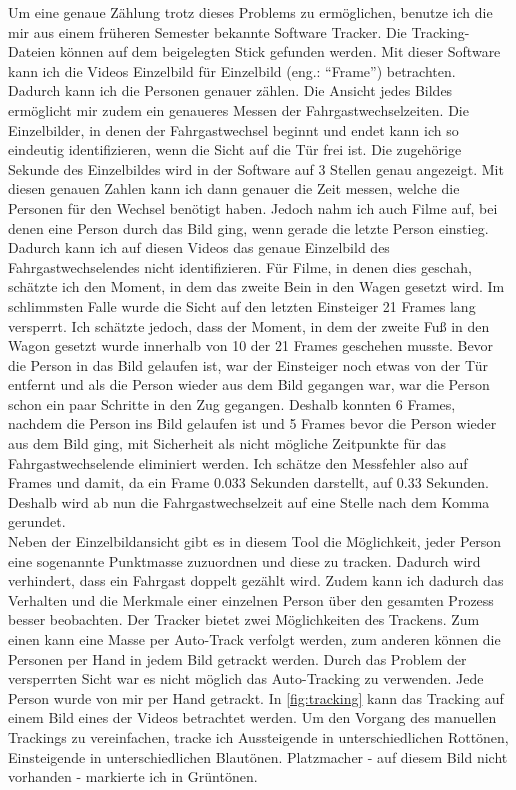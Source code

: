 Um eine genaue Zählung trotz dieses Problems zu ermöglichen, benutze ich die mir aus einem früheren Semester bekannte Software \textsf{Tracker}. Die Tracking-Dateien können auf dem beigelegten Stick gefunden werden. Mit dieser Software kann ich die Videos Einzelbild für Einzelbild (eng.: "`Frame"') betrachten. Dadurch kann ich die Personen genauer zählen. Die Ansicht jedes Bildes ermöglicht mir zudem ein genaueres Messen der Fahrgastwechselzeiten. Die Einzelbilder, in denen der Fahrgastwechsel beginnt und endet kann ich so eindeutig identifizieren, wenn die Sicht auf die Tür frei ist. Die zugehörige Sekunde des Einzelbildes wird in der Software auf 3 Stellen genau angezeigt. Mit diesen genauen Zahlen kann ich dann genauer die Zeit messen, welche die Personen für den Wechsel benötigt haben. Jedoch nahm ich auch Filme auf, bei denen eine Person durch das Bild ging, wenn gerade die letzte Person einstieg. Dadurch kann ich auf diesen Videos das genaue Einzelbild des Fahrgastwechselendes nicht identifizieren. Für Filme, in denen dies geschah, schätzte ich den Moment, in dem das zweite Bein in den Wagen gesetzt wird. Im schlimmsten Falle wurde die Sicht auf den letzten Einsteiger 21 Frames lang versperrt. Ich schätzte jedoch, dass der Moment, in dem der zweite Fuß in den Wagon gesetzt wurde innerhalb von 10 der 21 Frames geschehen musste. Bevor die Person in das Bild gelaufen ist, war der Einsteiger noch etwas von der Tür entfernt und als die Person wieder aus dem Bild gegangen war, war die Person schon ein paar Schritte in den Zug gegangen. Deshalb konnten 6 Frames, nachdem die Person ins Bild gelaufen ist und 5 Frames bevor die Person wieder aus dem Bild ging, mit Sicherheit als nicht mögliche Zeitpunkte für das Fahrgastwechselende eliminiert werden. Ich schätze den Messfehler also auf  Frames und damit, da ein Frame 0.033 Sekunden darstellt, auf 0.33 Sekunden. Deshalb wird ab nun die Fahrgastwechselzeit auf eine Stelle nach dem Komma gerundet.\\
Neben der Einzelbildansicht gibt es in diesem Tool die Möglichkeit, jeder Person eine sogenannte Punktmasse zuzuordnen und diese zu tracken. Dadurch wird verhindert, dass ein Fahrgast doppelt gezählt wird. Zudem kann ich dadurch das Verhalten und die Merkmale einer einzelnen Person über den gesamten Prozess besser beobachten. Der \textsf{Tracker} bietet zwei Möglichkeiten des Trackens. Zum einen kann eine Masse per Auto-Track verfolgt werden, zum anderen können die Personen per Hand in jedem Bild getrackt werden. Durch das Problem der versperrten Sicht war es nicht möglich das Auto-Tracking zu verwenden. Jede Person wurde von mir per Hand getrackt. In \figurename \ref{fig:tracking} kann das Tracking auf einem Bild eines der Videos betrachtet werden. Um den Vorgang des manuellen Trackings zu vereinfachen, tracke ich Aussteigende in unterschiedlichen Rottönen, Einsteigende in unterschiedlichen Blautönen. Platzmacher - auf diesem Bild nicht vorhanden - markierte ich in Grüntönen. \\
